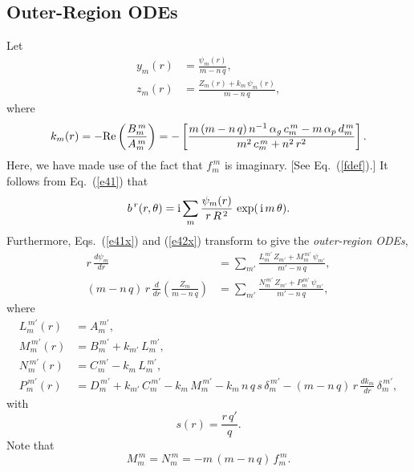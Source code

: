 \documentclass[12pt,prb,aps]{revtex4-1}
\begin{document}
\subsection{Outer-Region ODEs}\label{ode2}
Let 
\begin{align}
y_m(r) &= \frac{\psi_m(r)}{m-n\,q},\label{e115}\\[0.5ex]
z_m(r) &= \frac{Z_m(r)+k_m\,\psi_m(r)}{m-n\,q},\label{Zdef}
\end{align}
where
\begin{equation}\label{e117}
k_m(r) = -{\rm Re}\left(\frac{B_m^{\,m}}{A_m^{\,m}}\right) = -\left[\frac{m\,(m-n\,q)\,
n^{-1}\,\alpha_g\,c_m^{\,m} - m\,\alpha_p\,d_m^{\,m}}{m^2\,c_m^{\,m}+n^2\,r^2}\right].
\end{equation}
Here, we have made use of the fact that $f_m^{\,m}$ is imaginary. [See Eq.~(\ref{fdef}).] 
It follows from Eq.~(\ref{e41}) that
\begin{equation}\label{psidef}
b^{\,r}(r,\theta)= {\rm i}\sum_{m}\frac{\psi_m(r)}{r\,R^{\,2}}\,\exp(\,{\rm i}\,m\,\theta). 
\end{equation}
Furthermore, Eqs.~(\ref{e41x}) and (\ref{e42x}) transform to give the  {\em outer-region ODEs},\cite{am1,am3}
\begin{align}\label{e61x}
r\,\frac{d\psi_m}{dr} &=\sum_{m'}\frac{L_m^{\,m'}\,Z_{m'}+M_m^{\,m'}\,\psi_{m'}}{m'-n\,q},\\[0.5ex]
(m-n\,q)\,r\,\frac{d}{dr}\!\left(\frac{Z_m}{m-n\,q}\right)&=\sum_{m'}\frac{N_m^{\,m'}\,Z_{m'}+P_m^{\,m'}\,\psi_{m'}}{m'-n\,q},\label{e62x}
\end{align}
where
\begin{align}\label{e121}
L_m^{\,m'}(r) &=A_m^{\,m'},\\[0.5ex]
M_m^{\,m'}(r)& = B_m^{\,m'}+k_{m'}\,L_m^{\,m'},\\[0.5ex]
N_m^{\,m'}(r)&= C_m^{\,m'}-k_m\,L_m^{\,m'},\\[0.5ex]
P_m^{\,m'}(r) &=D_m^{\,m'}+k_{m'}\,C_m^{\,m'}  -k_m\,M_m^{\,m'}-k_m\,n\,q\,s\,\delta_m^{\,m'} - (m-n\,q)\,r\,\frac{dk_{m}}{dr}\,\delta_m^{\,m'},\label{e124}
\end{align}
with 
\begin{equation}
s(r)=\frac{r\,q'}{q}.
\end{equation}
Note that
\begin{equation}
M_m^{\,m}=N_m^{\,m} = - m\,(m-n\,q)\,f_m^{\,m}.
\end{equation}
\end{document}
